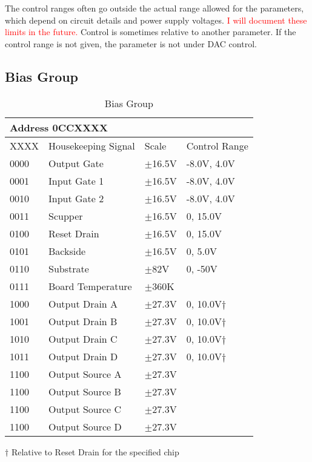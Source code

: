 \documentclass[12pt]{article}
\let\oldsubsection\subsection
\renewcommand{\subsection}{\FloatBarrier\oldsubsection}
\begin{document}
The control ranges often go outside the actual range allowed for the parameters, which depend on circuit details and power supply voltages. \textcolor{red}{I will document these limits in the future.} Control is sometimes relative to another parameter. If the control range is not given, the parameter is not under DAC control.
\subsection{Bias Group}
\begin{table}[ht!]
\caption{Bias Group}
\begin{tabular}{|l|l|l|l|}
\hline
\multicolumn{4}{|l|}{Address 0CCXXXX} \\
\hline
XXXX & Housekeeping Signal & Scale & Control Range \\
\hline
0000 & Output Gate & $\pm$16.5V & -8.0V, 4.0V \\
0001 & Input Gate 1 & $\pm$16.5V   & -8.0V, 4.0V \\
0010 & Input Gate 2 & $\pm$16.5V   & -8.0V, 4.0V \\
0011 & Scupper & $\pm$16.5V  & 0, 15.0V \\
0100 & Reset Drain & $\pm$16.5V & 0, 15.0V \\
0101 & Backside & $\pm$16.5V & 0, 5.0V \\
0110 & Substrate & $\pm$82V  & 0, -50V \\
0111 & Board Temperature & $\pm$360K &\\
1000 & Output Drain A & $\pm$27.3V & 0, 10.0V$\dagger$ \\
1001 & Output Drain B & $\pm$27.3V& 0, 10.0V$\dagger$ \\
1010 & Output Drain C & $\pm$27.3V& 0, 10.0V$\dagger$ \\
1011 & Output Drain D & $\pm$27.3V&  0, 10.0V$\dagger$ \\
1100 & Output Source A & $\pm$27.3V &\\
1100 & Output Source B & $\pm$27.3V &\\
1100 & Output Source C & $\pm$27.3V &\\
1100 & Output Source D & $\pm$27.3V &\\
\hline
\end{tabular}
\vspace{5pt}

$\dagger$ Relative to Reset Drain for the specified chip
\label{biastab}
\end{table}
\end{document}
